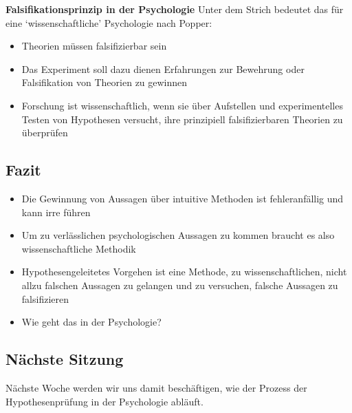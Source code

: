 \documentclass[
]{book}
\begin{document}
\textbf{Falsifikationsprinzip in der Psychologie}
Unter dem Strich bedeutet das für eine `wissenschaftliche' Psychologie nach Popper:

\begin{itemize}
\item
  Theorien müssen falsifizierbar sein
\item
  Das Experiment soll dazu dienen Erfahrungen zur Bewehrung oder Falsifikation von Theorien zu gewinnen
\item
  Forschung ist wissenschaftlich, wenn sie über Aufstellen und experimentelles Testen von Hypothesen versucht, ihre prinzipiell falsifizierbaren Theorien zu überprüfen
\end{itemize}

\hypertarget{fazit-1}{%
\subsection{Fazit}\label{fazit-1}}

\begin{itemize}
\item
  Die Gewinnung von Aussagen über intuitive Methoden ist fehleranfällig und kann irre führen
\item
  Um zu verlässlichen psychologischen Aussagen zu kommen braucht es also wissenschaftliche Methodik
\item
  Hypothesengeleitetes Vorgehen ist eine Methode, zu wissenschaftlichen, nicht allzu falschen Aussagen zu gelangen und zu versuchen, falsche Aussagen zu falsifizieren
\item
  Wie geht das in der Psychologie?
\end{itemize}

\hypertarget{nuxe4chste-sitzung}{%
\subsection{Nächste Sitzung}\label{nuxe4chste-sitzung}}

Nächste Woche werden wir uns damit beschäftigen, wie der Prozess der Hypothesenprüfung in der Psychologie abläuft.
\end{document}
